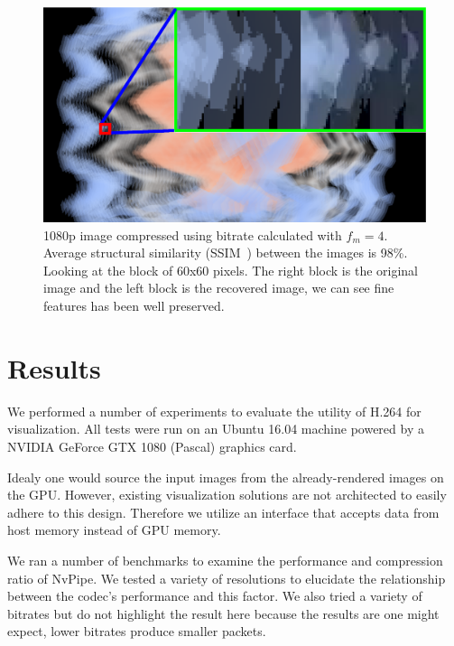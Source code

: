 \documentclass[review]{vgtc}                 %
\begin{document}
\begin{figure}[h]
  \centering
  \includegraphics[width=\columnwidth]{quality.eps}
  \caption{1080p image compressed using bitrate calculated with \(f_m=4\). Average structural similarity (SSIM~\cite{wang2004image}) between the images is 98\%. Looking at the block of 60x60 pixels. The right block is the original image and the left block is the recovered image, we can see fine features has been well preserved. }
  \label{fig:quality}
\end{figure}

\section{Results}

We performed a number of experiments to evaluate the utility of H.264 for visualization. All tests were run on an Ubuntu 16.04 machine powered by a NVIDIA GeForce GTX 1080 (Pascal) graphics card.

Idealy one would source the input images from the already-rendered images on the GPU. However, existing visualization solutions are not architected to easily adhere to this design. Therefore we utilize an interface that accepts data from host memory instead of GPU memory. 

We ran a number of benchmarks to examine the performance and compression ratio of NvPipe. We tested a variety of resolutions to elucidate the relationship between the codec's performance and this factor. We also tried a variety of bitrates but do not highlight the result here because the results are one might expect, lower bitrates produce smaller packets.
\end{document}
